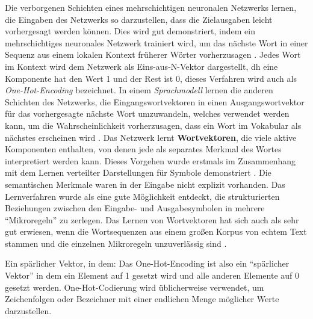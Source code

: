 Die verborgenen Schichten eines mehrschichtigen neuronalen Netzwerks lernen, die Eingaben des Netzwerks so darzustellen, dass die Zielausgaben leicht vorhergesagt werden können. Dies wird gut demonstriert, indem ein mehrschichtiges neuronales Netzwerk trainiert wird, um das nächste Wort in einer Sequenz aus einem lokalen Kontext früherer Wörter vorherzusagen \cite*{Bengio2003}. Jedes Wort im Kontext wird dem Netzwerk als Eins-aus-N-Vektor dargestellt, dh eine Komponente hat den Wert 1 und der Rest ist 0, dieses Verfahren wird auch als \textit{One-Hot-Encoding} bezeichnet. In einem \textit{Sprachmodell} lernen die anderen Schichten des Netzwerks, die Eingangswortvektoren in einen Ausgangswortvektor für das vorhergesagte nächste Wort umzuwandeln, welches verwendet werden kann, um die Wahrscheinlichkeit vorherzusagen, dass ein Wort im Vokabular als nächstes erscheinen wird \cite*{Lecun2015}. Das Netzwerk lernt \textbf{Wortvektoren}, die viele aktive Komponenten enthalten, von denen jede als separates Merkmal des Wortes interpretiert werden kann. Dieses Vorgehen wurde erstmals im Zusammenhang mit dem Lernen verteilter Darstellungen für Symbole demonstriert \cite*{Rumelhart1986}. Die semantischen Merkmale waren in der Eingabe nicht explizit vorhanden. Das Lernverfahren wurde als eine gute Möglichkeit entdeckt, die strukturierten Beziehungen zwischen den Eingabe- und Ausgabesymbolen in mehrere \enquote{Mikroregeln} zu zerlegen. Das Lernen von Wortvektoren hat sich auch als sehr gut erwiesen, wenn die Wortsequenzen aus einem großen Korpus von echtem Text stammen und die einzelnen Mikroregeln unzuverlässig sind \cite*{Bengio2003}.

Ein spärlicher Vektor, in dem:
Das One-Hot-Encoding ist also ein \enquote{spärlicher Vektor} in dem ein Element auf 1 gesetzt wird und alle anderen Elemente auf 0 gesetzt werden. One-Hot-Codierung wird üblicherweise verwendet, um Zeichenfolgen oder Bezeichner mit einer endlichen Menge möglicher Werte darzustellen. 



